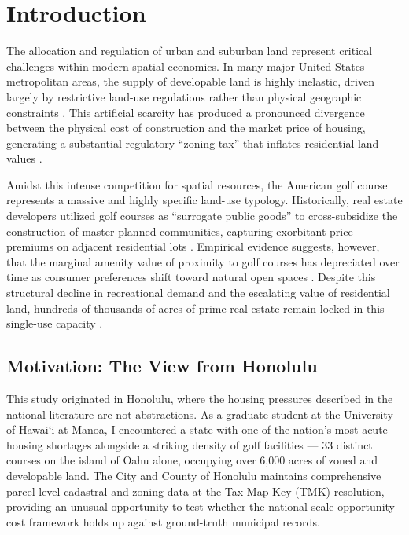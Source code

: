 \documentclass[11pt, letterpaper]{article}
\begin{document}
\newpage

\section{Introduction}

The allocation and regulation of urban and suburban land represent critical challenges within modern spatial economics. In many major United States metropolitan areas, the supply of developable land is highly inelastic, driven largely by restrictive land-use regulations rather than physical geographic constraints \parencite{Glaeser2017, Gyourko2021}. This artificial scarcity has produced a pronounced divergence between the physical cost of construction and the market price of housing, generating a substantial regulatory ``zoning tax'' that inflates residential land values \parencite{Glaeser2005, Davis2021}.

Amidst this intense competition for spatial resources, the American golf course represents a massive and highly specific land-use typology. Historically, real estate developers utilized golf courses as ``surrogate public goods'' to cross-subsidize the construction of master-planned communities, capturing exorbitant price premiums on adjacent residential lots \parencite{Limehouse2012}. Empirical evidence suggests, however, that the marginal amenity value of proximity to golf courses has depreciated over time as consumer preferences shift toward natural open spaces \parencite{Cho2009}. Despite this structural decline in recreational demand and the escalating value of residential land, hundreds of thousands of acres of prime real estate remain locked in this single-use capacity \parencite{Weinand2025}.

\subsection{Motivation: The View from Honolulu}

This study originated in Honolulu, where the housing pressures described in the national literature are not abstractions. As a graduate student at the University of Hawai`i at M\=anoa, I encountered a state with one of the nation's most acute housing shortages alongside a striking density of golf facilities --- 33 distinct courses on the island of Oahu alone, occupying over 6,000 acres of zoned and developable land. The City and County of Honolulu maintains comprehensive parcel-level cadastral and zoning data at the Tax Map Key (TMK) resolution, providing an unusual opportunity to test whether the national-scale opportunity cost framework holds up against ground-truth municipal records.
\end{document}
